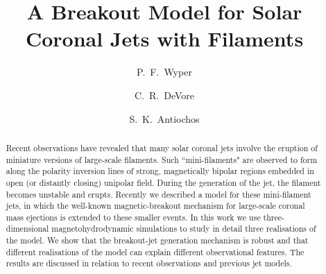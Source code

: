 \documentclass[twocolumn]{aastex6}
\begin{document}
\title{A Breakout Model for Solar Coronal Jets with Filaments}


\author{P.~F.~Wyper} 

\author{C.~R.~DeVore} 

\author{S.~K.~Antiochos} 

\begin{abstract}
Recent observations have revealed that many solar coronal jets involve the eruption of miniature versions of large-scale filaments. Such ``mini-filaments" are observed to form along the polarity inversion lines of strong, magnetically bipolar regions embedded in open (or distantly closing) unipolar field. During the generation of the jet, the filament becomes unstable and erupts. Recently we described a model for these mini-filament jets, in which the well-known magnetic-breakout mechanism for large-scale coronal mass ejections is extended to these smaller events. In this work we use three-dimensional magnetohydrodynamic simulations to study in detail three realisations of the model. We show that the breakout-jet generation mechanism is robust and that different realisations of the model can explain different observational features. The results are discussed in relation to recent observations and previous jet models.
\end{abstract}


\end{document}
